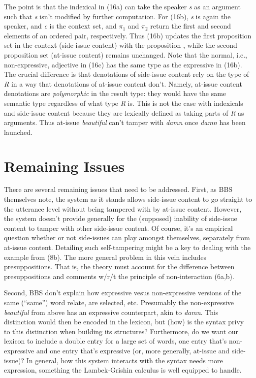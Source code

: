 \documentclass[12pt]{article}
\begin{document}
The point is that the indexical in (16a) can take the speaker \textit{s} as an argument such that \textit{s} isn't modified by further computation. For (16b), \textit{s} is again the speaker, and \textit{c} is the context set, and $\pi_1$ and $\pi_2$ return the first and second elements of an ordered pair, respectively. Thus (16b) updates the first proposition set in the context (side-issue content) with the proposition  , while the second proposition set (at-issue content) remains unchanged. Note that the normal, i.e., non-expressive, adjective in (16c) has the same type as the expressive in (16b). The crucial difference is that denotations of side-issue content rely on the type of \textit{R} in a way that denotations of at-issue content don't. Namely, at-issue content denotations are \textit{polymorphic} in the result type: they would have the same semantic type regardless of what type \textit{R} is. This is not the case with indexicals and side-issue content because they are lexically defined as taking parts of \textit{R} as arguments. Thus at-issue \textit{beautiful} can't tamper with \textit{damn} once \textit{damn} has been launched.

\section{Remaining Issues}

There are several remaining issues that need to be addressed. First, as BBS themselves note, the system as it stands allows side-issue content to go straight to the utterance level without being tampered with by at-issue content. However, the system doesn't provide generally for the (supposed) inability of side-issue content to tamper with other side-issue content. Of course, it's an empirical question whether or not side-issues can play amongst themselves, separately from at-issue content. Detailing such self-tampering might be a key to dealing with the example from (8b). The more general problem in this vein includes presuppositions. That is, the theory must account for the difference between presuppositions and comments w/r/t the principle of non-interaction (6a,b).

Second, BBS don't explain how expressive vesus non-expressive versions of the same (``same'') word relate, are selected, etc. Presumably the non-expressive \textit{beautiful} from above has an expressive counterpart, akin to \textit{damn}. This distinction would then be encoded in the lexicon, but (how) is the syntax privy to this distinction when building its structures? Furthermore, do we want our lexicon to include a double entry for a large set of words, one entry that's non-expressive and one entry that's expressive (or, more generally, at-issue and side-issue)? In general, how this system interacts with the syntax needs more expression, something the Lambek-Grishin calculus is well equipped to handle. 
\end{document}
